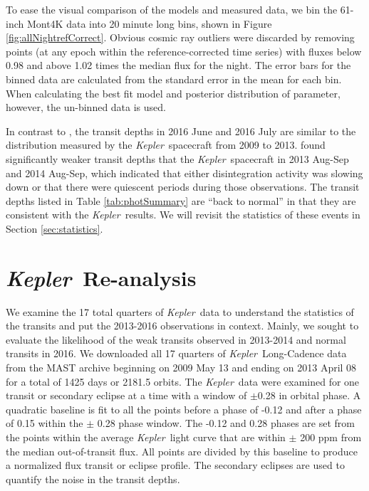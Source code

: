 \documentclass[preprint,trackchanges]{aastex61}
\newcommand{\kepler}{{\it Kepler}}
\begin{document}
To ease the visual comparison of the models and measured data, we bin the 61-inch Mont4K data into 20 minute long bins, shown in Figure \ref{fig:allNightrefCorrect}.
Obvious cosmic ray outliers were discarded by removing points (at any epoch within the reference-corrected time series) with fluxes below 0.98 and above 1.02 times the median flux for the night.
The error bars for the binned data are calculated from the standard error in the mean for each bin.
When calculating the best fit model and posterior distribution of parameter, however, the un-binned data is used.

In contrast to \citet{schlawin2016kic1255}, the transit depths in 2016 June and 2016 July are similar to the distribution measured by the \kepler\ spacecraft from 2009 to 2013.
\citet{schlawin2016kic1255} found significantly weaker transit depths that the \kepler\ spacecraft in 2013 Aug-Sep and 2014 Aug-Sep, which indicated that either disintegration activity was slowing down or that there were quiescent periods during those observations.
The transit depths listed in Table \ref{tab:photSummary} are ``back to normal'' in that they are consistent with the \kepler\ results.
We will revisit the statistics of these events in Section \ref{sec:statistics}.

\section{\kepler\ Re-analysis}\label{sec:Kepler}

We examine the 17 total quarters of \kepler\ data to understand the statistics of the transits and put the 2013-2016 observations in context. Mainly, we sought to evaluate the likelihood of the weak transits observed in 2013-2014 and normal transits in 2016.
We downloaded all 17 quarters of \kepler\ Long-Cadence data from the MAST archive beginning on 2009 May 13 and ending on 2013 April 08 for a total of 1425 days or 2181.5 orbits.
The \kepler\ data were examined for one transit or secondary eclipse at a time with a window of $\pm$0.28 in orbital phase.
A quadratic baseline is fit to all the points before a phase of -0.12 and after a phase of 0.15 within the $\pm$ 0.28 phase window.
The -0.12 and 0.28 phases are set from the points within the average \kepler\ light curve that are within $\pm$ 200 ppm from the median out-of-transit flux.
All points are divided by this baseline to produce a normalized flux transit or eclipse profile.
The secondary eclipses are used to quantify the noise in the transit depths.
\end{document}
